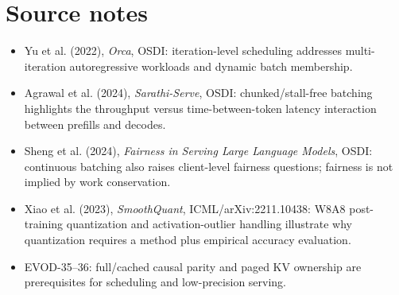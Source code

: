 \chapter*{Source notes}
\begin{itemize}
\item Yu et al. (2022), \emph{Orca}, OSDI: iteration-level scheduling addresses multi-iteration autoregressive workloads and dynamic batch membership.
\item Agrawal et al. (2024), \emph{Sarathi-Serve}, OSDI: chunked/stall-free batching highlights the throughput versus time-between-token latency interaction between prefills and decodes.
\item Sheng et al. (2024), \emph{Fairness in Serving Large Language Models}, OSDI: continuous batching also raises client-level fairness questions; fairness is not implied by work conservation.
\item Xiao et al. (2023), \emph{SmoothQuant}, ICML/arXiv:2211.10438: W8A8 post-training quantization and activation-outlier handling illustrate why quantization requires a method plus empirical accuracy evaluation.
\item EVOD-35--36: full/cached causal parity and paged KV ownership are prerequisites for scheduling and low-precision serving.
\end{itemize}